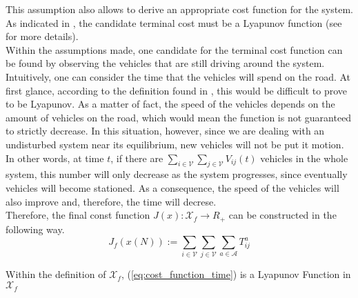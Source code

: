 This assumption also allows to derive an appropriate cost function for the system. As indicated in , the candidate terminal cost must be a Lyapunov function (see  for more details).  \\
Within the assumptions made, one candidate for the terminal cost function can be found by observing the vehicles that are still driving around the system. \\
Intuitively, one can consider the time that the vehicles will spend on the road. At first glance, according to the definition found in , this would be difficult to prove to be Lyapunov. As a matter of fact, the speed of the vehicles depends on the amount of vehicles on the road, which would mean the function is not guaranteed to strictly decrease. In this situation, however, since we are dealing with an undisturbed system near its equilibrium, new vehicles will not be put it motion. In other words, at time $t$, if there are $\sum_{i \in \mathcal{V}}\sum_{j \in \mathcal{V}}V_{ij}(t)$ vehicles in the whole system, this number will only decrease as the system progresses, since eventually vehicles will become stationed. As a consequence, the speed of the vehicles will also improve and, therefore, the time will decrese. \\
Therefore, the final const function $J(x) : \mathcal{X}_f \rightarrow R_+$ can be constructed in the following way. 
\begin{equation}
	J_f(x(N)):= \sum_{i \in \mathcal{V}}\sum_{j \in \mathcal{V}}\sum_{a \in\mathcal{A}}T_{ij}^a
	\label{eq:cost_function_time}
\end{equation}

\begin{proposition}{}
Within the definition of $\mathcal{X}_f$, (\ref{eq:cost_function_time}) is a Lyapunov Function in $\mathcal{X}_f$
\end{proposition}\\

